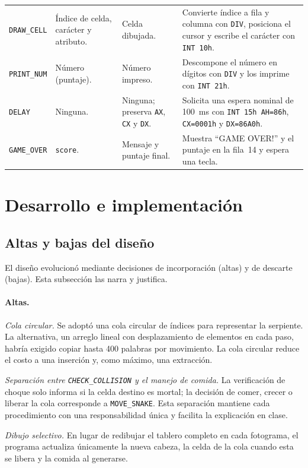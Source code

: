 \documentclass[10pt]{article}
\begin{document}
\begin{longtable}{@{}p{2.5cm}p{3cm}p{2.6cm}p{5cm}@{}}
\texttt{DRAW\_CELL} & Índice de celda, carácter y atributo. & Celda dibujada. & Convierte índice a fila y columna con \texttt{DIV}, posiciona el cursor y escribe el carácter con \texttt{INT 10h}. \\
\texttt{PRINT\_NUM} & Número (puntaje). & Número impreso. & Descompone el número en dígitos con \texttt{DIV} y los imprime con \texttt{INT 21h}. \\
\texttt{DELAY} & Ninguna. & Ninguna; preserva \texttt{AX}, \texttt{CX} y \texttt{DX}. & Solicita una espera nominal de 100~ms con \texttt{INT 15h AH=86h}, \texttt{CX=0001h} y \texttt{DX=86A0h}. \\
\texttt{GAME\_OVER} & \texttt{score}. & Mensaje y puntaje final. & Muestra ``GAME OVER!'' y el puntaje en la fila~14 y espera una tecla. \\
\end{longtable}

\section{Desarrollo e implementación}

\subsection{Altas y bajas del diseño}
El diseño evolucionó mediante decisiones de incorporación (altas) y de descarte (bajas). Esta subsección las narra y justifica.

\paragraph{Altas.}
\emph{Cola circular.} Se adoptó una cola circular de índices para representar la serpiente. La alternativa, un arreglo lineal con desplazamiento de elementos en cada paso, habría exigido copiar hasta 400 palabras por movimiento. La cola circular reduce el costo a una inserción y, como máximo, una extracción.

\emph{Separación entre \texttt{CHECK\_COLLISION} y el manejo de comida.} La verificación de choque solo informa si la celda destino es mortal; la decisión de comer, crecer o liberar la cola corresponde a \texttt{MOVE\_SNAKE}. Esta separación mantiene cada procedimiento con una responsabilidad única y facilita la explicación en clase.

\emph{Dibujo selectivo.} En lugar de redibujar el tablero completo en cada fotograma, el programa actualiza únicamente la nueva cabeza, la celda de la cola cuando esta se libera y la comida al generarse.
\end{document}
